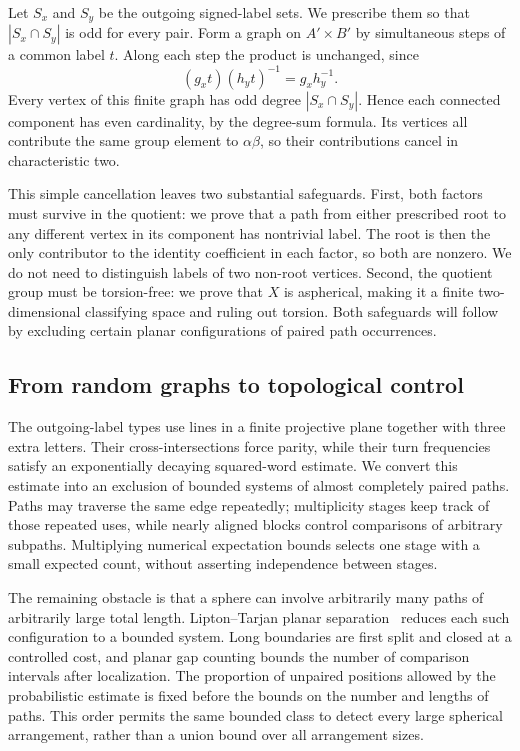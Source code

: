 \documentclass[11pt]{article}
\theoremstyle{definition}
\numberwithin{equation}{section}
\begin{document}
Let \(S_x\) and \(S_y\) be the outgoing signed-label sets. We prescribe them so that \(|S_x\cap S_y|\) is odd for every pair. Form a graph on \(A'\times B'\) by simultaneous steps of a common label \(t\). Along each step the product is unchanged, since
\begin{equation}\label{eq:overview-common-step}
 (g_xt)(h_yt)^{-1}=g_xh_y^{-1}.
\end{equation}
Every vertex of this finite graph has odd degree \(|S_x\cap S_y|\). Hence each connected component has even cardinality, by the degree-sum formula. Its vertices all contribute the same group element to \(\alpha\beta\), so their contributions cancel in characteristic two.

This simple cancellation leaves two substantial safeguards. First, both factors must survive in the quotient: we prove that a path from either prescribed root to any different vertex in its component has nontrivial label. The root is then the only contributor to the identity coefficient in each factor, so both are nonzero. We do not need to distinguish labels of two non-root vertices. Second, the quotient group must be torsion-free: we prove that \(X\) is aspherical, making it a finite two-dimensional classifying space and ruling out torsion. Both safeguards will follow by excluding certain planar configurations of paired path occurrences.

\subsection*{From random graphs to topological control}

The outgoing-label types use lines in a finite projective plane together with three extra letters. Their cross-intersections force parity, while their turn frequencies satisfy an exponentially decaying squared-word estimate. We convert this estimate into an exclusion of bounded systems of almost completely paired paths. Paths may traverse the same edge repeatedly; multiplicity stages keep track of those repeated uses, while nearly aligned blocks control comparisons of arbitrary subpaths. Multiplying numerical expectation bounds selects one stage with a small expected count, without asserting independence between stages.

The remaining obstacle is that a sphere can involve arbitrarily many paths of arbitrarily large total length. Lipton--Tarjan planar separation~\cite{LiptonTarjan1979} reduces each such configuration to a bounded system. Long boundaries are first split and closed at a controlled cost, and planar gap counting bounds the number of comparison intervals after localization. The proportion of unpaired positions allowed by the probabilistic estimate is fixed before the bounds on the number and lengths of paths. This order permits the same bounded class to detect every large spherical arrangement, rather than a union bound over all arrangement sizes.
\end{document}

